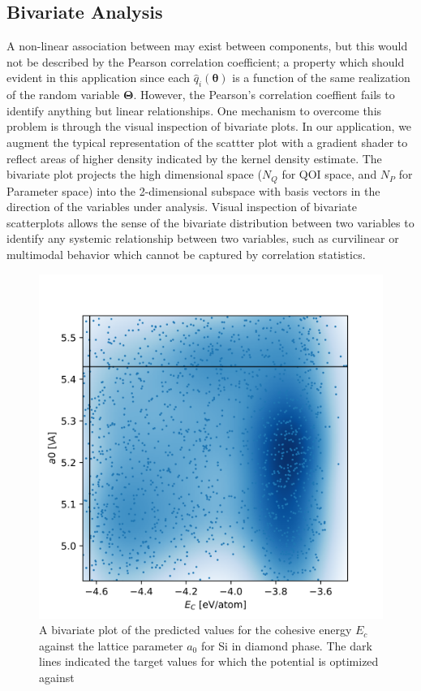 \subsection{Bivariate Analysis}

A non-linear association between may exist between components, but this would not be described by the Pearson correlation coefficient; a property which should evident in this application since each $\hat{q}_i(\bm{\theta})$ is a function of the same realization of the random variable $\bm{\Theta}$.  However, the Pearson's correlation coeffient fails to identify anything but linear relationships.  One mechanism to overcome this problem is through the visual inspection of bivariate plots.  In our application, we augment the typical representation of the scattter plot with a gradient shader to reflect areas of higher density indicated by the kernel density estimate.  The bivariate plot projects the high dimensional space ($N_Q$ for QOI space, and $N_P$ for Parameter space) into the 2-dimensional subspace with basis vectors in the direction of the variables under analysis.  Visual inspection of bivariate scatterplots allows the sense of the bivariate distribution between two variables to identify any systemic relationship between two variables, such as curvilinear or multimodal behavior which cannot be captured by correlation statistics.

\begin{figure}[ht]
  \centering
  \includegraphics[width=5in]{chapter8/qoi_2d_density_plots/Si_dia_E_coh__Si_dia_a0}
  \caption{A bivariate plot of the predicted values for the cohesive energy $E_c$ against the lattice parameter $a_0$ for Si in diamond phase.  The dark lines indicated the target values for which the potential is optimized against}
  \label{fig:Si_Ec_a0_scatterplot}
\end{figure}


